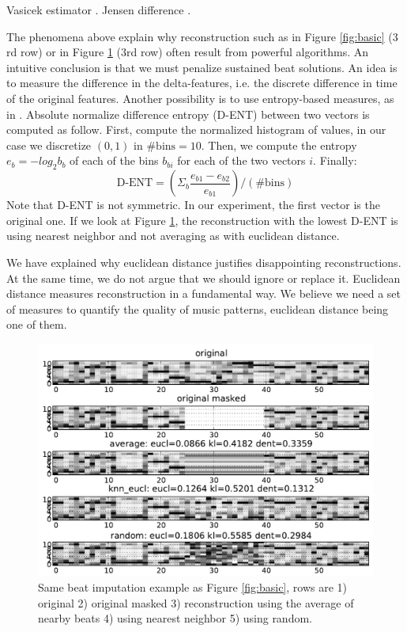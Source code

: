 \documentclass{article}
\begin{document}
Vasicek estimator \cite{Learned-Miller2003}.
Jensen difference \cite{Michel1994}.

The phenomena above explain why reconstruction such as
in Figure \ref{fig:basic} ($3$rd row) or in Figure \ref{fig:avgnnrand}
($3$rd row) often result from powerful algorithms. An intuitive
conclusion is that we must penalize sustained beat solutions.
An idea is to measure the difference in the delta-features, i.e.
the discrete difference in time of the original features.
Another possibility is to use entropy-based measures, as in
\cite{Mentzelopoulos2004}.
Absolute normalize difference entropy (D-ENT)
between two vectors is computed as follow. First, compute the normalized histogram 
of values, in our case we discretize $(0,1)$ in $\mbox{\# bins} = 10$. 
Then, we compute the entropy
$e_b = - log_2 b_b$ of each of the bins $b_{bi}$ for each of the two vectors $i$. Finally:
\[
\mbox{D-ENT} = \left( \Sigma_b \frac{e_{b1} - e_{b2}}{e_{b1}} \right) / (\mbox{\# bins})
\]
Note that D-ENT is not symmetric. In our experiment, the first vector is the original one.
If we look at Figure \ref{fig:avgnnrand}, the reconstruction with the lowest D-ENT is using
nearest neighbor and not averaging as with euclidean distance.

We have explained why euclidean distance justifies disappointing reconstructions. At the same
time, we do not argue that we should ignore or replace it. Euclidean distance measures
reconstruction in a fundamental way. We believe we need a set of measures to quantify the
quality of music patterns, euclidean distance being one of them.

\begin{figure}[t]
\begin{center}
\includegraphics[width=.95\columnwidth]{avg_nn_rand}
\end{center}
\caption{Same beat imputation example as Figure \ref{fig:basic}, 
rows are 1) original 2) original masked
3) reconstruction using the average of nearby beats 4) using
nearest neighbor 5) using random.
\label{fig:avgnnrand}}
\end{figure}
\end{document}
